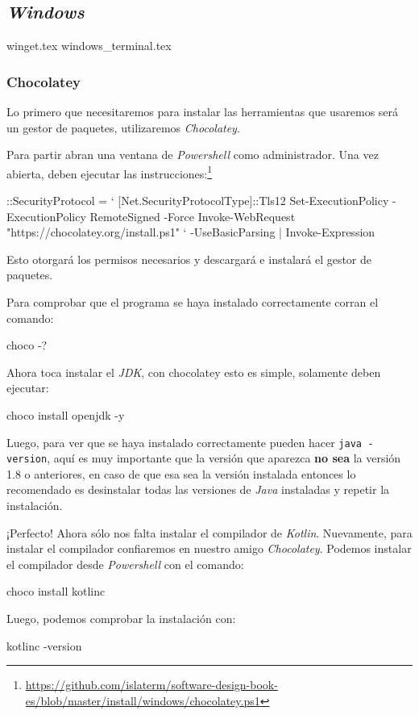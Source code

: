 \subsection{\textit{Windows}}
  {winget.tex}
  {windows_terminal.tex}
  \subsubsection{Chocolatey}
    Lo primero que necesitaremos para instalar las herramientas que usaremos será un gestor de 
    paquetes, utilizaremos \textit{Chocolatey}.
  
    Para partir abran una ventana de \textit{Powershell} como administrador.
    Una vez abierta, deben ejecutar las instrucciones:\footnote{
      \url{https://github.com/islaterm/software-design-book-es/blob/master/install/windows/chocolatey.ps1}
    }
    \begin{powershell}
      ::SecurityProtocol = `
        [Net.SecurityProtocolType]::Tls12
      Set-ExecutionPolicy -ExecutionPolicy RemoteSigned -Force
      Invoke-WebRequest "https://chocolatey.org/install.ps1" `
        -UseBasicParsing | Invoke-Expression
    \end{powershell}
  
    Esto otorgará los permisos necesarios y descargará e instalará el gestor de paquetes.
  
    Para comprobar que el programa se haya instalado correctamente corran el comando:
    \begin{powershell}
      choco -?
    \end{powershell}
    Ahora toca instalar el \textit{JDK}, con chocolatey esto es simple, solamente deben ejecutar:
    \begin{powershell}
      choco install openjdk -y
    \end{powershell}
    
    Luego, para ver que se haya instalado correctamente pueden hacer \texttt{java -version}, aquí es
    muy importante que la versión que aparezca \textbf{no sea} la versión 1.8 o anteriores, en caso 
    de que esa sea la versión instalada entonces lo recomendado es desinstalar todas las versiones
    de \textit{Java} instaladas y repetir la instalación.
  
    ¡Perfecto!
    Ahora sólo nos falta instalar el compilador de \textit{Kotlin}.
    Nuevamente, para instalar el compilador confiaremos en nuestro amigo 
    \textit{Chocolatey}.
    Podemos instalar el compilador desde \textit{Powershell} con el comando:

    \begin{powershell}
      choco install kotlinc
    \end{powershell}

    Luego, podemos comprobar la instalación con:
    \begin{powershell}
      kotlinc -version
    \end{powershell}